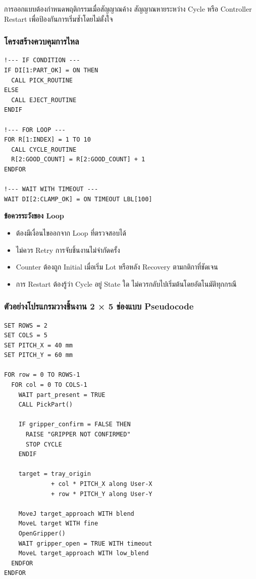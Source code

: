 การออกแบบต้องกำหนดพฤติกรรมเมื่อสัญญาณค้าง สัญญาณหายระหว่าง Cycle หรือ Controller Restart เพื่อป้องกันการเริ่มซ้ำโดยไม่ตั้งใจ

\subsubsection{โครงสร้างควบคุมการไหล}

\begin{verbatim}
!--- IF CONDITION ---
IF DI[1:PART_OK] = ON THEN
  CALL PICK_ROUTINE
ELSE
  CALL EJECT_ROUTINE
ENDIF

!--- FOR LOOP ---
FOR R[1:INDEX] = 1 TO 10
  CALL CYCLE_ROUTINE
  R[2:GOOD_COUNT] = R[2:GOOD_COUNT] + 1
ENDFOR

!--- WAIT WITH TIMEOUT ---
WAIT DI[2:CLAMP_OK] = ON TIMEOUT LBL[100]
\end{verbatim}

\textbf{ข้อควรระวังของ Loop}

\begin{itemize}
    \item ต้องมีเงื่อนไขออกจาก Loop ที่ตรวจสอบได้
    \item ไม่ควร Retry การจับชิ้นงานไม่จำกัดครั้ง
    \item Counter ต้องถูก Initial เมื่อเริ่ม Lot หรือหลัง Recovery ตามกติกาที่ชัดเจน
    \item การ Restart ต้องรู้ว่า Cycle อยู่ State ใด ไม่ควรกลับไปเริ่มต้นโดยอัตโนมัติทุกกรณี
\end{itemize}

\subsubsection{ตัวอย่างโปรแกรมวางชิ้นงาน 2 × 5 ช่องแบบ Pseudocode}

\begin{verbatim}
SET ROWS = 2
SET COLS = 5
SET PITCH_X = 40 mm
SET PITCH_Y = 60 mm

FOR row = 0 TO ROWS-1
  FOR col = 0 TO COLS-1
    WAIT part_present = TRUE
    CALL PickPart()

    IF gripper_confirm = FALSE THEN
      RAISE "GRIPPER NOT CONFIRMED"
      STOP CYCLE
    ENDIF

    target = tray_origin
             + col * PITCH_X along User-X
             + row * PITCH_Y along User-Y

    MoveJ target_approach WITH blend
    MoveL target WITH fine
    OpenGripper()
    WAIT gripper_open = TRUE WITH timeout
    MoveL target_approach WITH low_blend
  ENDFOR
ENDFOR
\end{verbatim}

